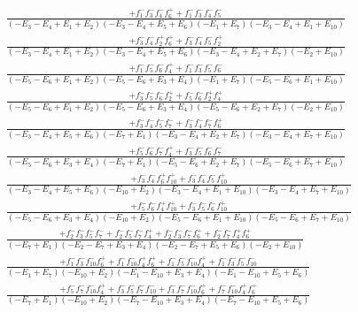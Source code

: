 \documentclass{article}
\begin{document}
\[\begin{array}{rcl}
\frac{+f_{1}^{-}f_{3}^{-}f_{4}^{-}f_{6}^{+}+f_{1}^{-}f_{3}^{-}f_{4}^{-}f_{5}^{-}}{(-E_{3}-E_{4}+E_{1}+E_{2})(-E_{3}-E_{4}+E_{5}+E_{6})(-E_{1}+E_{7})(-E_{3}-E_{4}+E_{1}+E_{10})}\\
\frac{+f_{3}^{-}f_{4}^{-}f_{2}^{+}f_{6}^{+}+f_{3}^{-}f_{4}^{-}f_{5}^{-}f_{2}^{+}}{(-E_{3}-E_{4}+E_{1}+E_{2})(-E_{3}-E_{4}+E_{5}+E_{6})(-E_{3}-E_{4}+E_{2}+E_{7})(-E_{2}+E_{10})}\\
\frac{+f_{1}^{-}f_{5}^{-}f_{6}^{-}f_{4}^{+}+f_{1}^{-}f_{3}^{-}f_{5}^{-}f_{6}^{-}}{(-E_{5}-E_{6}+E_{1}+E_{2})(-E_{5}-E_{6}+E_{3}+E_{4})(-E_{1}+E_{7})(-E_{5}-E_{6}+E_{1}+E_{10})}\\
\frac{+f_{3}^{-}f_{5}^{-}f_{6}^{-}f_{2}^{+}+f_{5}^{-}f_{6}^{-}f_{2}^{+}f_{4}^{+}}{(-E_{5}-E_{6}+E_{1}+E_{2})(-E_{5}-E_{6}+E_{3}+E_{4})(-E_{5}-E_{6}+E_{2}+E_{7})(-E_{2}+E_{10})}\\
\frac{+f_{3}^{-}f_{4}^{-}f_{5}^{-}f_{7}^{-}+f_{3}^{-}f_{4}^{-}f_{7}^{-}f_{6}^{+}}{(-E_{3}-E_{4}+E_{5}+E_{6})(-E_{7}+E_{1})(-E_{3}-E_{4}+E_{2}+E_{7})(-E_{3}-E_{4}+E_{7}+E_{10})}\\
\frac{+f_{5}^{-}f_{6}^{-}f_{7}^{-}f_{4}^{+}+f_{3}^{-}f_{5}^{-}f_{6}^{-}f_{7}^{-}}{(-E_{5}-E_{6}+E_{3}+E_{4})(-E_{7}+E_{1})(-E_{5}-E_{6}+E_{2}+E_{7})(-E_{5}-E_{6}+E_{7}+E_{10})}\\
\frac{+f_{3}^{-}f_{4}^{-}f_{6}^{+}f_{10}^{+}+f_{3}^{-}f_{4}^{-}f_{5}^{-}f_{10}^{+}}{(-E_{3}-E_{4}+E_{5}+E_{6})(-E_{10}+E_{2})(-E_{3}-E_{4}+E_{1}+E_{10})(-E_{3}-E_{4}+E_{7}+E_{10})}\\
\frac{+f_{5}^{-}f_{6}^{-}f_{4}^{+}f_{10}^{+}+f_{3}^{-}f_{5}^{-}f_{6}^{-}f_{10}^{+}}{(-E_{5}-E_{6}+E_{3}+E_{4})(-E_{10}+E_{2})(-E_{5}-E_{6}+E_{1}+E_{10})(-E_{5}-E_{6}+E_{7}+E_{10})}\\
\frac{+f_{2}^{-}f_{3}^{-}f_{5}^{-}f_{7}^{-}+f_{2}^{-}f_{5}^{-}f_{7}^{-}f_{4}^{+}+f_{2}^{-}f_{3}^{-}f_{7}^{-}f_{6}^{+}+f_{2}^{-}f_{7}^{-}f_{4}^{+}f_{6}^{+}}{(-E_{7}+E_{1})(-E_{2}-E_{7}+E_{3}+E_{4})(-E_{2}-E_{7}+E_{5}+E_{6})(-E_{2}+E_{10})}\\
\frac{+f_{1}^{-}f_{3}^{-}f_{10}^{-}f_{6}^{+}+f_{1}^{-}f_{10}^{-}f_{4}^{+}f_{6}^{+}+f_{1}^{-}f_{5}^{-}f_{10}^{-}f_{4}^{+}+f_{1}^{-}f_{3}^{-}f_{5}^{-}f_{10}^{-}}{(-E_{1}+E_{7})(-E_{10}+E_{2})(-E_{1}-E_{10}+E_{3}+E_{4})(-E_{1}-E_{10}+E_{5}+E_{6})}\\
\frac{+f_{5}^{-}f_{7}^{-}f_{10}^{-}f_{4}^{+}+f_{3}^{-}f_{5}^{-}f_{7}^{-}f_{10}^{-}+f_{3}^{-}f_{7}^{-}f_{10}^{-}f_{6}^{+}+f_{7}^{-}f_{10}^{-}f_{4}^{+}f_{6}^{+}}{(-E_{7}+E_{1})(-E_{10}+E_{2})(-E_{7}-E_{10}+E_{3}+E_{4})(-E_{7}-E_{10}+E_{5}+E_{6})}\\

\end{array}\]
\end{document}
